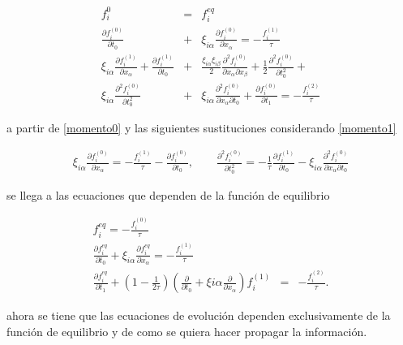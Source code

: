 \begin{eqnarray}
\label{momento0}
f_{i}^{0} &=& f_{i}^{eq} \\
\label{momento1}
\frac{\partial f_{i}^{(0)}}{\partial t_{0}} &+& \xi_{i\alpha}\frac{\partial f_{i}^{(0)}}{\partial x_{\alpha}} = -\frac{f_{i}^{(1)}}{\tau} \\
\xi_{i\alpha}\frac{\partial f_{i}^{(1)}}{\partial x_{\alpha}} + \frac{\partial f_{i}^{(1)}}{\partial t_{0}} &+& \frac{\xi_{i\alpha}\xi_{i\beta}}{2}\frac{\partial^{2}f_{i}^{(0)}}{\partial x_{\alpha}\partial x_{\beta}}+\frac{1}{2}\frac{\partial^{2}f_{i}^{(0)}}{\partial t_{0}^{2}}+\nonumber \\
\xi_{i\alpha}\frac{\partial^{2}f_{i}^{(0)}}{\partial t_{0}^{2}}&+&\xi_{i\alpha}\frac{\partial^{2}f_{i}^{(0)}}{\partial x_{\alpha}\partial t_{0}}+\frac{\partial f_{i}^{(0)}}{\partial t_{1}} = -\frac{f_{i}^{(2)}}{\tau} 
\end{eqnarray}

\noindent a partir de \eqref{momento0} y las siguientes sustituciones considerando \eqref{momento1}

\begin{eqnarray}
\xi_{i\alpha}\frac{\partial f_{i}^{(0)}}{\partial x_{\alpha}} = -\frac{f_{i}^{(1)}}{\tau}-\frac{\partial f_{i}^{(0)}}{\partial t_{0}}, \qquad \frac{\partial^{2} f_{i}^{(0)}}{\partial t_{0}^{2}}=-\frac{1}{\tau}\frac{\partial f_{i}^{(1)}}{\partial t_{0}}-\xi_{i\alpha}\frac{\partial^{2}f_{i}^{(0)}}{\partial x_{\alpha}\partial t_{0}}
\end{eqnarray}

\noindent se llega a las ecuaciones que dependen de la función de equilibrio 

\begin{eqnarray}
f_{i}^{eq}=-\frac{f_{i}^{(0)}}{\tau}\\
\frac{\partial f_{i}^{eq}}{\partial t_{0}} + \xi_{i\alpha}\frac{\partial f_{i}^{eq}}{\partial x_{\alpha}} = -\frac{f_{i}^{(1)}}{\tau} \\
\frac{\partial f_{i}^{eq}}{\partial t_{1}}+\left(1-\frac{1}{2\tau}\right)\left(\frac{\partial}{\partial t_{0}}+\xi{i\alpha}\frac{\partial}{\partial x_{\alpha}}\right)f_{i}^{(1)} &=& -\frac{f_{i}^{(2)}}{\tau}.
\end{eqnarray}

\noindent ahora se tiene que las ecuaciones de evolución dependen exclusivamente de la función de equilibrio y de como se quiera hacer propagar la información. 

